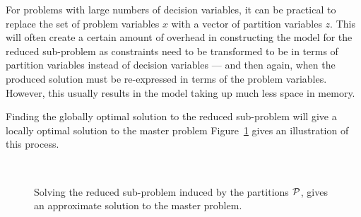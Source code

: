 \documentclass[preprint]{elsarticle}
\begin{document}
For problems with large numbers of decision variables, it can be practical to replace the set of problem variables $x$ with a vector of partition variables $z$. This will often create a certain amount of overhead in constructing the model for the reduced sub-problem as constraints need to be transformed to be in terms of partition variables instead of decision variables --- and then again, when the produced solution must be re-expressed in terms of the problem variables. However, this usually results in the model taking up much less space in memory.

Finding the globally optimal solution to the reduced sub-problem will give a locally optimal solution to the master problem Figure~\ref{fig:merge-solve} gives an illustration of this process.


\begin{figure}[t]
  \centering
  \qquad \qquad
  \\[0.5cm] 
  \qquad \quad
  \caption{Solving the reduced sub-problem induced by the partitions ${\cal P}$, gives an approximate solution to the master problem.} 
    \label{fig:merge-solve}
\end{figure}
\end{document}
